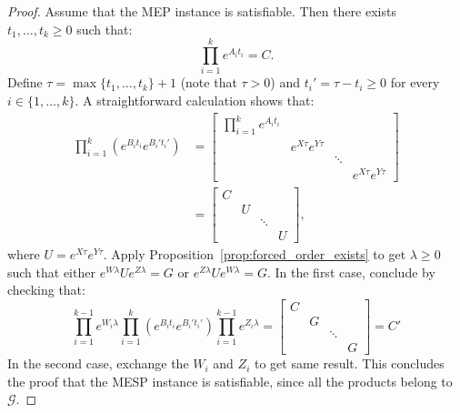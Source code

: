 \begin{proof}
Assume that the MEP instance is satisfiable. Then there exists $t_1,\ldots,t_k\geqslant0$ such that:
\[\prod_{i=1}^ke^{A_it_i}=C.\]
Define $\tau=\max\{t_1,\ldots,t_k\}+1$ (note that $\tau>0$) and $t_i'=\tau-t_i\geqslant0$ for every $i\in\{1,\ldots,k\}$.
A straightforward calculation shows that:
\begin{align*}
\prod_{i=1}^k\left(e^{B_it_i}e^{B_i't_i'}\right)
    &=\begin{bmatrix}\prod_{i=1}^ke^{A_it_i}&&&\\&e^{X\tau}e^{Y\tau}&&\\&&\ddots&\\&&&e^{X\tau}e^{Y\tau}\end{bmatrix}\\
    &=\begin{bmatrix}C&&&\\&U&&\\&&\ddots&\\&&&U\end{bmatrix},
\end{align*}
where $U=e^{X\tau}e^{Y\tau}$. Apply Proposition~\ref{prop:forced_order_exists} to get $\lambda\geqslant0$
such that either $e^{W\lambda}Ue^{Z\lambda}=G$ or $e^{Z\lambda}Ue^{W\lambda}=G$. In the first case, conclude by
checking that:
\[
\prod_{i=1}^{k-1}e^{W_i\lambda}\prod_{i=1}^k\left(e^{B_it_i}e^{B_i't_i'}\right)\prod_{i=1}^{k-1}e^{Z_i\lambda}
    =\begin{bmatrix}C&&&\\&G&&\\&&\ddots&\\&&&G\end{bmatrix}=C'
\]
In the second case, exchange the $W_i$ and $Z_i$ to get same result. This concludes the proof that
the MESP instance is satisfiable, since all the products belong to $\mathcal{G}$.


\end{proof}
